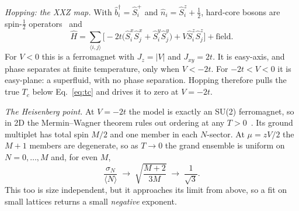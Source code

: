 \documentclass[twocolumn,10pt]{article}
\newcommand{\bd}{\hat b^\dagger}
\newcommand{\avg}[1]{\langle #1 \rangle}
\begin{document}
\emph{Hopping: the XXZ map.} With $\bd_i=\hat S^+_i$ and $\hat n_i=\hat S^z_i+\tfrac12$,
hard-core bosons are spin-$\tfrac12$ operators~\cite{matsubara} and
\begin{equation}
\hat H=\sum_{\langle i,j\rangle}\Big[-2t\big(\hat S^x_i\hat S^x_j+\hat S^y_i\hat S^y_j\big)
+V\hat S^z_i\hat S^z_j\Big]+\text{field}.
\end{equation}
For $V<0$ this is a ferromagnet with $J_z=|V|$ and $J_{xy}=2t$. It is easy-axis,
and phase separates at finite temperature, only when $V<-2t$. For $-2t<V<0$ it is
easy-plane: a superfluid, with no phase separation. Hopping therefore pulls the
true $T_c$ below Eq.~\eqref{eq:tc} and drives it to zero at $V=-2t$.

\emph{The Heisenberg point.} At $V=-2t$ the model is exactly an SU(2)
ferromagnet, so in 2D the Mermin--Wagner theorem rules out ordering at any $T>0$~\cite{mermin}. Its ground multiplet has total spin $M/2$ and one
member in each $N$-sector. At $\mu=zV/2$ the $M+1$ members are degenerate, so as
$T\to0$ the grand ensemble is uniform on $N=0,\dots,M$ and, for even $M$,
\begin{equation}
\frac{\sigma_N}{\avg N}\;\to\;\sqrt{\frac{M+2}{3M}}\;\to\;\frac1{\sqrt3}.
\label{eq:heis}
\end{equation}
This too is size independent, but it approaches its limit from above, so a fit on
small lattices returns a small \emph{negative} exponent.
\end{document}
